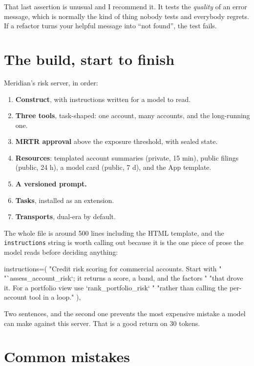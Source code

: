 That last assertion is unusual and I recommend it. It tests the \emph{quality} of
an error message, which is normally the kind of thing nobody tests and everybody
regrets. If a refactor turns your helpful message into ``not found'', the test
fails.

\section{The build, start to finish}

Meridian's risk server, in order:

\begin{enumerate}[leftmargin=1.6em, itemsep=3pt]
\item \textbf{Construct}, with instructions written for a model to read.
\item \textbf{Three tools}, task-shaped: one account, many accounts, and the
long-running one.
\item \textbf{MRTR approval} above the exposure threshold, with sealed state.
\item \textbf{Resources}: templated account summaries (private, 15 min), public
filings (public, 24 h), a model card (public, 7 d), and the App template.
\item \textbf{A versioned prompt.}
\item \textbf{Tasks}, installed as an extension.
\item \textbf{Transports}, dual-era by default.
\end{enumerate}

The whole file is around 500 lines including the HTML template, and the
\texttt{instructions} string is worth calling out because it is the one piece of
prose the model reads before deciding anything:

\begin{py}
instructions=(
    "Credit risk scoring for commercial accounts. Start with "
    "`assess_account_risk`; it returns a score, a band, and the factors "
    "that drove it. For a portfolio view use `rank_portfolio_risk` "
    "rather than calling the per-account tool in a loop."
),
\end{py}

Two sentences, and the second one prevents the most expensive mistake a model
can make against this server. That is a good return on 30 tokens.

\section{Common mistakes}

